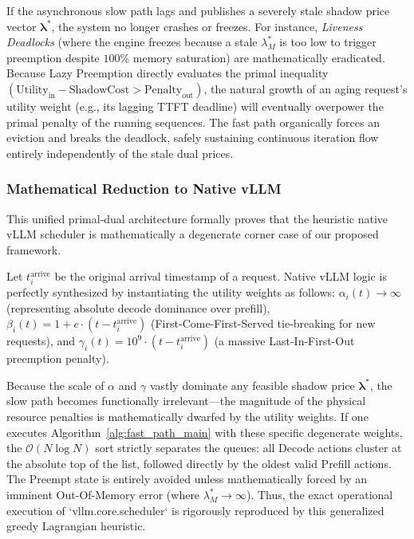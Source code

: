 \documentclass[11pt]{article}
\begin{document}
If the asynchronous slow path lags and publishes a severely stale shadow price vector $\boldsymbol{\lambda}^*$, the system no longer crashes or freezes. For instance, \textit{Liveness Deadlocks} (where the engine freezes because a stale $\lambda_M^*$ is too low to trigger preemption despite $100\%$ memory saturation) are mathematically eradicated. Because Lazy Preemption directly evaluates the primal inequality $(\text{Utility}_{\text{in}} - \text{ShadowCost} > \text{Penalty}_{\text{out}})$, the natural growth of an aging request's utility weight (e.g., its lagging TTFT deadline) will eventually overpower the primal penalty of the running sequences. The fast path organically forces an eviction and breaks the deadlock, safely sustaining continuous iteration flow entirely independently of the stale dual prices.


\subsubsection{Mathematical Reduction to Native vLLM}
\label{subsubsec:reduction_to_vllm}

This unified primal-dual architecture formally proves that the heuristic native vLLM scheduler is mathematically a degenerate corner case of our proposed framework. 

Let $t_i^{\text{arrive}}$ be the original arrival timestamp of a request. Native vLLM logic is perfectly synthesized by instantiating the utility weights as follows: $\alpha_i(t) \to \infty$ (representing absolute decode dominance over prefill), $\beta_i(t) = 1 + c \cdot (t - t_i^{\text{arrive}})$ (First-Come-First-Served tie-breaking for new requests), and $\gamma_i(t) = 10^9 \cdot (t - t_i^{\text{arrive}})$ (a massive Last-In-First-Out preemption penalty).

Because the scale of $\alpha$ and $\gamma$ vastly dominate any feasible shadow price $\boldsymbol{\lambda}^*$, the slow path becomes functionally irrelevant—the magnitude of the physical resource penalties is mathematically dwarfed by the utility weights. If one executes Algorithm~\ref{alg:fast_path_main} with these specific degenerate weights, the $\mathcal{O}(N \log N)$ sort strictly separates the queues: all Decode actions cluster at the absolute top of the list, followed directly by the oldest valid Prefill actions. The Preempt state is entirely avoided unless mathematically forced by an imminent Out-Of-Memory error (where $\lambda_M^* \to \infty$). Thus, the exact operational execution of `vllm.core.scheduler` is rigorously reproduced by this generalized greedy Lagrangian heuristic.
\end{document}
